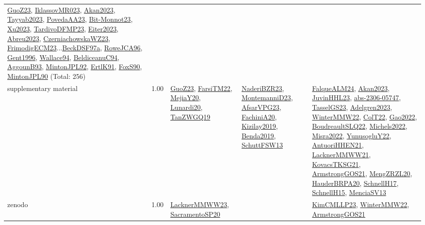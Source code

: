 {\begin{longtable}{p{3cm}r>{\raggedright\arraybackslash}p{6cm}>{\raggedright\arraybackslash}p{6cm}>{\raggedright\arraybackslash}p{8cm}}
\hyperref[detail:GuoZ23]{GuoZ23}, \hyperref[detail:IklassovMR023]{IklassovMR023}, \hyperref[detail:Akan2023]{Akan2023}, \hyperref[detail:Tayyab2023]{Tayyab2023}, \hyperref[detail:PovedaAA23]{PovedaAA23}, \hyperref[detail:Bit-Monnot23]{Bit-Monnot23}, \hyperref[detail:Xu2023]{Xu2023}, \hyperref[detail:TardivoDFMP23]{TardivoDFMP23}, \hyperref[detail:Eiter2023]{Eiter2023}, \hyperref[detail:Abreu2023]{Abreu2023}, \hyperref[detail:CzerniachowskaWZ23]{CzerniachowskaWZ23}, \hyperref[detail:FrimodigECM23]{FrimodigECM23}...\hyperref[detail:BeckDSF97a]{BeckDSF97a}, \hyperref[detail:RoweJCA96]{RoweJCA96}, \hyperref[detail:Gent1996]{Gent1996}, \hyperref[detail:Wallace94]{Wallace94}, \hyperref[detail:BeldiceanuC94]{BeldiceanuC94}, \hyperref[detail:AggounB93]{AggounB93}, \hyperref[detail:MintonJPL92]{MintonJPL92}, \hyperref[detail:ErtlK91]{ErtlK91}, \hyperref[detail:FoxS90]{FoxS90}, \hyperref[detail:MintonJPL90]{MintonJPL90} (Total: 256)\\
\index{supplementary material}\index{Benchmarks!supplementary material}supplementary material &  1.00 & \hyperref[detail:GuoZ23]{GuoZ23}, \hyperref[detail:FarsiTM22]{FarsiTM22}, \hyperref[detail:MejiaY20]{MejiaY20}, \hyperref[detail:Lunardi20]{Lunardi20}, \hyperref[detail:TanZWGQ19]{TanZWGQ19} & \hyperref[detail:NaderiBZR23]{NaderiBZR23}, \hyperref[detail:MontemanniD23]{MontemanniD23}, \hyperref[detail:AfsarVPG23]{AfsarVPG23}, \hyperref[detail:FachiniA20]{FachiniA20}, \hyperref[detail:Kizilay2019]{Kizilay2019}, \hyperref[detail:Benda2019]{Benda2019}, \hyperref[detail:SchuttFSW13]{SchuttFSW13} & \hyperref[detail:FalqueALM24]{FalqueALM24}, \hyperref[detail:Akan2023]{Akan2023}, \hyperref[detail:JuvinHHL23]{JuvinHHL23}, \hyperref[detail:abs-2306-05747]{abs-2306-05747}, \hyperref[detail:TasselGS23]{TasselGS23}, \hyperref[detail:Adelgren2023]{Adelgren2023}, \hyperref[detail:WinterMMW22]{WinterMMW22}, \hyperref[detail:ColT22]{ColT22}, \hyperref[detail:Gao2022]{Gao2022}, \hyperref[detail:BoudreaultSLQ22]{BoudreaultSLQ22}, \hyperref[detail:Michels2022]{Michels2022}, \hyperref[detail:Misra2022]{Misra2022}, \hyperref[detail:YunusogluY22]{YunusogluY22}, \hyperref[detail:AntuoriHHEN21]{AntuoriHHEN21}, \hyperref[detail:LacknerMMWW21]{LacknerMMWW21}, \hyperref[detail:KovacsTKSG21]{KovacsTKSG21}, \hyperref[detail:ArmstrongGOS21]{ArmstrongGOS21}, \hyperref[detail:MengZRZL20]{MengZRZL20}, \hyperref[detail:HauderBRPA20]{HauderBRPA20}, \hyperref[detail:SchnellH17]{SchnellH17}, \hyperref[detail:SchnellH15]{SchnellH15}, \hyperref[detail:MenciaSV13]{MenciaSV13}\\
\index{zenodo}\index{Benchmarks!zenodo}zenodo &  1.00 & \hyperref[detail:LacknerMMWW23]{LacknerMMWW23}, \hyperref[detail:SacramentoSP20]{SacramentoSP20} &  & \hyperref[detail:KimCMLLP23]{KimCMLLP23}, \hyperref[detail:WinterMMW22]{WinterMMW22}, \hyperref[detail:ArmstrongGOS21]{ArmstrongGOS21}\\
\end{longtable}
}

